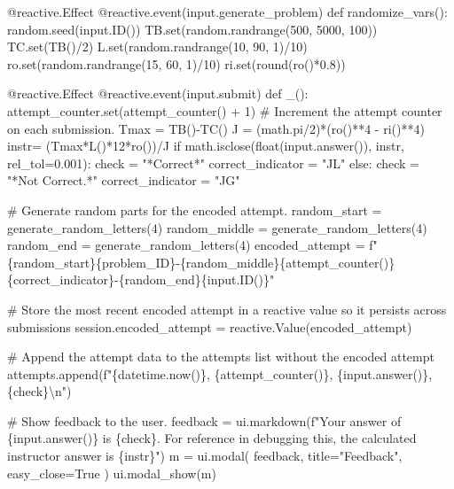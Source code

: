 \documentclass[
  letterpaper,
  DIV=11,
  numbers=noendperiod]{scrreprt}
\newenvironment{Shaded}{\begin{snugshade}}{\end{snugshade}}
\newcommand{\NormalTok}[1]{\textcolor[rgb]{0.00,0.23,0.31}{#1}}
\begin{document}
\begin{Shaded}
\begin{Highlighting}[]
\NormalTok{    @reactive.Effect}
\NormalTok{    @reactive.event(input.generate\_problem)}
\NormalTok{    def randomize\_vars():}
\NormalTok{        random.seed(input.ID())}
\NormalTok{        TB.set(random.randrange(500, 5000, 100))}
\NormalTok{        TC.set(TB()/2)}
\NormalTok{        L.set(random.randrange(10, 90, 1)/10)}
\NormalTok{        ro.set(random.randrange(15, 60, 1)/10)}
\NormalTok{        ri.set(round(ro()*0.8))}
        
        
\NormalTok{    @reactive.Effect}
\NormalTok{    @reactive.event(input.submit)}
\NormalTok{    def \_():}
\NormalTok{        attempt\_counter.set(attempt\_counter() + 1)  \# Increment the attempt counter on each submission.}
\NormalTok{        Tmax = TB(){-}TC()}
\NormalTok{        J = (math.pi/2)*(ro()**4 {-} ri()**4)}
\NormalTok{        instr= (Tmax*L()*12*ro())/J}
\NormalTok{        if math.isclose(float(input.answer()), instr, rel\_tol=0.001):}
\NormalTok{            check = "*Correct*"}
\NormalTok{            correct\_indicator = "JL"}
\NormalTok{        else:}
\NormalTok{            check = "*Not Correct.*"}
\NormalTok{            correct\_indicator = "JG"}

\NormalTok{        \# Generate random parts for the encoded attempt.}
\NormalTok{        random\_start = generate\_random\_letters(4)}
\NormalTok{        random\_middle = generate\_random\_letters(4)}
\NormalTok{        random\_end = generate\_random\_letters(4)}
\NormalTok{        encoded\_attempt = f"\{random\_start\}\{problem\_ID\}{-}\{random\_middle\}\{attempt\_counter()\}\{correct\_indicator\}{-}\{random\_end\}\{input.ID()\}"}

\NormalTok{        \# Store the most recent encoded attempt in a reactive value so it persists across submissions}
\NormalTok{        session.encoded\_attempt = reactive.Value(encoded\_attempt)}

\NormalTok{        \# Append the attempt data to the attempts list without the encoded attempt}
\NormalTok{        attempts.append(f"\{datetime.now()\}, \{attempt\_counter()\}, \{input.answer()\}, \{check\}\textbackslash{}n")}

\NormalTok{        \# Show feedback to the user.}
\NormalTok{        feedback = ui.markdown(f"Your answer of \{input.answer()\} is \{check\}. For reference in debugging this, the calculated instructor answer is \{instr\}")}
\NormalTok{        m = ui.modal(}
\NormalTok{            feedback,}
\NormalTok{            title="Feedback",}
\NormalTok{            easy\_close=True}
\NormalTok{        )}
\NormalTok{        ui.modal\_show(m)}


\end{Highlighting}
\end{Shaded}
\end{document}
